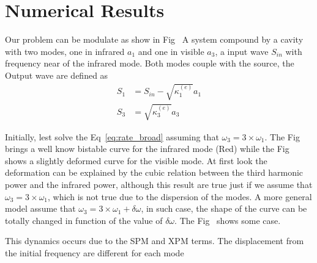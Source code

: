 \section{Numerical Results}

Our problem can be modulate as show in Fig~%
A system compound by a cavity with two modes, one in infrared $a_1$ and one in visible $a_3$, a input wave $S_{in}$ with frequency near of the infrared mode. Both modes couple with the source, the Output wave are defined as 
\begin{subequations}
    \begin{align}
        S_1 &= S_{in} - \sqrt{\kappa^{(e)}_1}a_1\\
        S_3 &= \sqrt{\kappa^{(e)}_3}a_3
    \end{align}
\end{subequations}

Initially, lest solve the Eq~\ref{eq:rate_broad} assuming that $\omega_3 = 3\times\omega_1$. The Fig~%
brings a well know bistable curve for the infrared mode (Red) while the Fig~%
shows a slightly deformed curve for the visible mode. At first look the deformation can be explained by the cubic relation between the third harmonic power and the infrared power, although this result are true just if we assume that $\omega_3 = 3\times\omega_1$, which is not true due to the dispersion of the modes. A more general model assume that $\omega_3 = 3\times\omega_1 + \delta\omega$, in such case, the shape of the curve can be totally changed in function of the value of $\delta\omega$. The Fig~%
shows some case. 

This dynamics occurs due to the SPM and XPM terms. The displacement from the initial frequency are different for each mode 